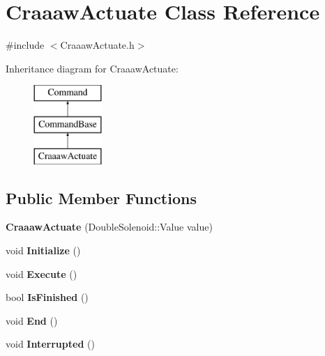 \hypertarget{class_craaaw_actuate}{}\section{Craaaw\+Actuate Class Reference}
\label{class_craaaw_actuate}


{\ttfamily \#include $<$Craaaw\+Actuate.\+h$>$}

Inheritance diagram for Craaaw\+Actuate\+:\begin{figure}[H]
\begin{center}
\leavevmode
\includegraphics[height=3.000000cm]{class_craaaw_actuate}
\end{center}
\end{figure}
\subsection*{Public Member Functions}
\begin{DoxyCompactItemize}
\item 
\hypertarget{class_craaaw_actuate_ad652cf4f2560cb399e4649a47d3e472a}{}{\bfseries Craaaw\+Actuate} (Double\+Solenoid\+::\+Value value)\label{class_craaaw_actuate_ad652cf4f2560cb399e4649a47d3e472a}

\item 
\hypertarget{class_craaaw_actuate_aba3e1ec2c8eaa70e15d46477fa2225aa}{}void {\bfseries Initialize} ()\label{class_craaaw_actuate_aba3e1ec2c8eaa70e15d46477fa2225aa}

\item 
\hypertarget{class_craaaw_actuate_a42f8b323a22505255d68a89b1bf2fe76}{}void {\bfseries Execute} ()\label{class_craaaw_actuate_a42f8b323a22505255d68a89b1bf2fe76}

\item 
\hypertarget{class_craaaw_actuate_ad80a466af7f6f9a2d3a9d8c27cc85abb}{}bool {\bfseries Is\+Finished} ()\label{class_craaaw_actuate_ad80a466af7f6f9a2d3a9d8c27cc85abb}

\item 
\hypertarget{class_craaaw_actuate_a952ab82f0967b018693ca668ff515492}{}void {\bfseries End} ()\label{class_craaaw_actuate_a952ab82f0967b018693ca668ff515492}

\item 
\hypertarget{class_craaaw_actuate_a6f024ab216b31a00919e918a02adbf03}{}void {\bfseries Interrupted} ()\label{class_craaaw_actuate_a6f024ab216b31a00919e918a02adbf03}

\end{DoxyCompactItemize}
